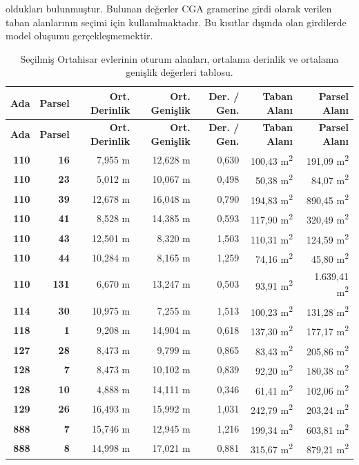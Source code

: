 \documentclass[12pt,turkish,a4paperpaper,]{report}
\begin{document}
oldukları bulunmuştur. Bulunan değerler CGA gramerine girdi olarak
verilen taban alanlarının seçimi için kullanılmaktadır. Bu kısıtlar
dışında olan girdilerde model oluşumu gerçekleşmemektir.

\begin{longtable}[]{@{}rrrrrrr@{}}
\caption{Seçilmiş Ortahisar evlerinin oturum alanları, ortalama derinlik
ve ortalama genişlik değerleri tablosu.
\label{EvlerAlanlarOrtalamalar}}\tabularnewline
\toprule
\textbf{Ada} & \textbf{Parsel} & \textbf{Ort. Derinlik} & \textbf{Ort.
Genişlik} & \textbf{Der. / Gen.} & \textbf{Taban Alanı} & \textbf{Parsel
Alanı}\tabularnewline
\midrule
\endfirsthead
\toprule
\textbf{Ada} & \textbf{Parsel} & \textbf{Ort. Derinlik} & \textbf{Ort.
Genişlik} & \textbf{Der. / Gen.} & \textbf{Taban Alanı} & \textbf{Parsel
Alanı}\tabularnewline
\midrule
\endhead
\textbf{110} & \textbf{16} & 7,955 m & 12,628 m & 0,630 & 100,43
m\textsuperscript{2} & 191,09 m\textsuperscript{2}\tabularnewline
\textbf{110} & \textbf{23} & 5,012 m & 10,067 m & 0,498 & 50,38
m\textsuperscript{2} & 84,07 m\textsuperscript{2}\tabularnewline
\textbf{110} & \textbf{39} & 12,678 m & 16,048 m & 0,790 & 194,83
m\textsuperscript{2} & 890,45 m\textsuperscript{2}\tabularnewline
\textbf{110} & \textbf{41} & 8,528 m & 14,385 m & 0,593 & 117,90
m\textsuperscript{2} & 320,49 m\textsuperscript{2}\tabularnewline
\textbf{110} & \textbf{43} & 12,501 m & 8,320 m & 1,503 & 110,31
m\textsuperscript{2} & 124,59 m\textsuperscript{2}\tabularnewline
\textbf{110} & \textbf{44} & 10,284 m & 8,165 m & 1,259 & 74,16
m\textsuperscript{2} & 45,80 m\textsuperscript{2}\tabularnewline
\textbf{110} & \textbf{131} & 6,670 m & 13,247 m & 0,503 & 93,91
m\textsuperscript{2} & 1.639,41 m\textsuperscript{2}\tabularnewline
\textbf{114} & \textbf{30} & 10,975 m & 7,255 m & 1,513 & 100,23
m\textsuperscript{2} & 131,28 m\textsuperscript{2}\tabularnewline
\textbf{118} & \textbf{1} & 9,208 m & 14,904 m & 0,618 & 137,30
m\textsuperscript{2} & 177,17 m\textsuperscript{2}\tabularnewline
\textbf{127} & \textbf{28} & 8,473 m & 9,799 m & 0,865 & 83,43
m\textsuperscript{2} & 205,86 m\textsuperscript{2}\tabularnewline
\textbf{128} & \textbf{7} & 8,473 m & 10,102 m & 0,839 & 92,20
m\textsuperscript{2} & 180,38 m\textsuperscript{2}\tabularnewline
\textbf{128} & \textbf{10} & 4,888 m & 14,111 m & 0,346 & 61,41
m\textsuperscript{2} & 102,06 m\textsuperscript{2}\tabularnewline
\textbf{129} & \textbf{26} & 16,493 m & 15,992 m & 1,031 & 242,79
m\textsuperscript{2} & 203,24 m\textsuperscript{2}\tabularnewline
\textbf{888} & \textbf{7} & 15,746 m & 12,945 m & 1,216 & 199,34
m\textsuperscript{2} & 603,81 m\textsuperscript{2}\tabularnewline
\textbf{888} & \textbf{8} & 14,998 m & 17,021 m & 0,881 & 315,67
m\textsuperscript{2} & 879,21 m\textsuperscript{2}\tabularnewline
\bottomrule
\end{longtable}
\end{document}
